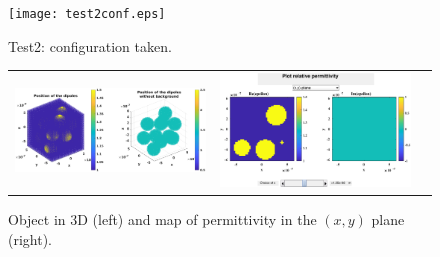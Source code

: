 \begin{figure}[H]
\begin{center}
  \texttt{[image: test2conf.eps]}
\end{center}
\caption{Test2: configuration taken.}
\label{test2conf}
\end{figure}


\begin{figure}[H]
\begin{center}
\begin{tabular}{ccc}
  \includegraphics*[width=7.0cm,draft=false]{test2dipolepos.eps}
& \includegraphics*[width=7.0cm,draft=false]{test2epsilon.eps}
\end{tabular}

\end{center}
\caption{Object in 3D (left) and map of permittivity in the $(x,y)$
  plane (right).}
\end{figure}


